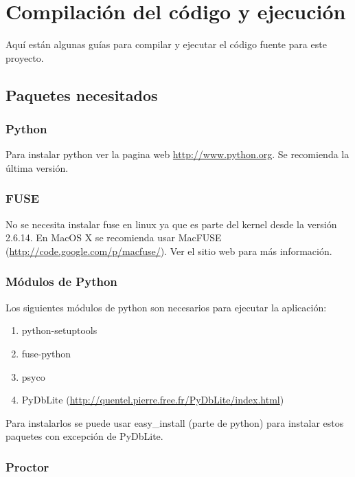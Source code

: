 \chapter{Compilación del código y ejecución}

Aquí están algunas guías para compilar y ejecutar el código fuente para este proyecto.

\section{Paquetes necesitados}

\subsection{Python}

Para instalar python ver la pagina web \url{http://www.python.org}. Se recomienda la última versión.

\subsection{FUSE}

No se necesita instalar fuse en linux ya que es parte del kernel desde la versión 2.6.14. En MacOS X se recomienda usar MacFUSE (\url{http://code.google.com/p/macfuse/}). Ver el sitio web para más información.

\subsection{Módulos de Python}

Los siguientes módulos de python son necesarios para ejecutar la aplicación:

\begin{enumerate}
\item python-setuptools
\item fuse-python
\item psyco
\item PyDbLite (\url{http://quentel.pierre.free.fr/PyDbLite/index.html})
\end{enumerate}

Para instalarlos se puede usar easy\_install (parte de python) para instalar estos paquetes con excepción de PyDbLite.

\subsection{Proctor}

